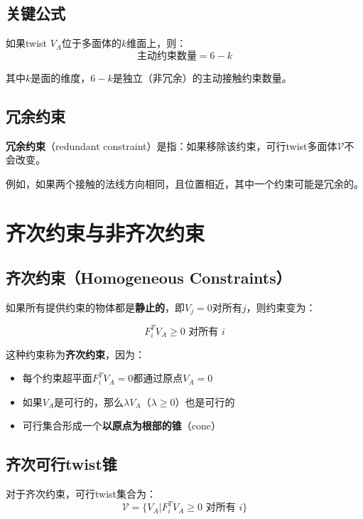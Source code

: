 \documentclass[12pt,a4paper]{article}
\begin{document}
\subsection{关键公式}

如果twist $V_A$位于多面体的$k$维面上，则：
\begin{equation}
\text{主动约束数量} = 6 - k
\label{eq:active_constraints}
\end{equation}

其中$k$是面的维度，$6 - k$是独立（非冗余）的主动接触约束数量。

\subsection{冗余约束}

\textbf{冗余约束}（redundant constraint）是指：如果移除该约束，可行twist多面体$\mathcal{V}$不会改变。

例如，如果两个接触的法线方向相同，且位置相近，其中一个约束可能是冗余的。

\section{齐次约束与非齐次约束}

\subsection{齐次约束（Homogeneous Constraints）}

如果所有提供约束的物体都是\textbf{静止的}，即$V_j = 0$对所有$j$，则约束变为：

\begin{equation}
F_i^T V_A \geq 0 \text{ 对所有 } i
\label{eq:homogeneous}
\end{equation}

这种约束称为\textbf{齐次约束}，因为：
\begin{itemize}
\item 每个约束超平面$F_i^T V_A = 0$都通过原点$V_A = 0$
\item 如果$V_A$是可行的，那么$\lambda V_A$（$\lambda \geq 0$）也是可行的
\item 可行集合形成一个\textbf{以原点为根部的锥}（cone）
\end{itemize}

\subsection{齐次可行twist锥}

对于齐次约束，可行twist集合为：
\begin{equation}
\mathcal{V} = \{V_A | F_i^T V_A \geq 0 \text{ 对所有 } i\}
\label{eq:homogeneous_cone}
\end{equation}
\end{document}
